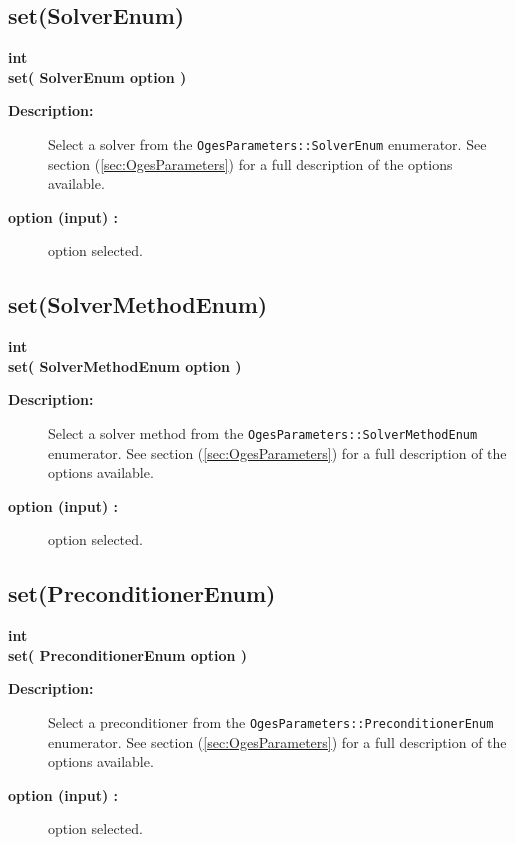 \subsection{set(SolverEnum)}
 
\begin{flushleft} \textbf{%
int  \\ 
\settowidth{\OgesIncludeArgIndent}{set(}%
set(  SolverEnum option )
}\end{flushleft}
\begin{description}
\item[{\bf Description:}] 
   Select a solver from the {\tt OgesParameters::SolverEnum} enumerator.
  See section (\ref{sec:OgesParameters}) for a full description of the options available.
\item[{\bf option (input) :}]  option selected.
\end{description}
\subsection{set(SolverMethodEnum)}
 
\begin{flushleft} \textbf{%
int  \\ 
\settowidth{\OgesIncludeArgIndent}{set(}%
set(  SolverMethodEnum option )
}\end{flushleft}
\begin{description}
\item[{\bf Description:}] 
   Select a solver method from the {\tt OgesParameters::SolverMethodEnum} enumerator.
  See section (\ref{sec:OgesParameters}) for a full description of the options available.
\item[{\bf option (input) :}]  option selected.
\end{description}
\subsection{set(PreconditionerEnum)}
 
\begin{flushleft} \textbf{%
int  \\ 
\settowidth{\OgesIncludeArgIndent}{set(}%
set(  PreconditionerEnum option )
}\end{flushleft}
\begin{description}
\item[{\bf Description:}] 
   Select a preconditioner from the {\tt OgesParameters::PreconditionerEnum} enumerator.
  See section (\ref{sec:OgesParameters}) for a full description of the options available.
\item[{\bf option (input) :}]  option selected.
\end{description}

